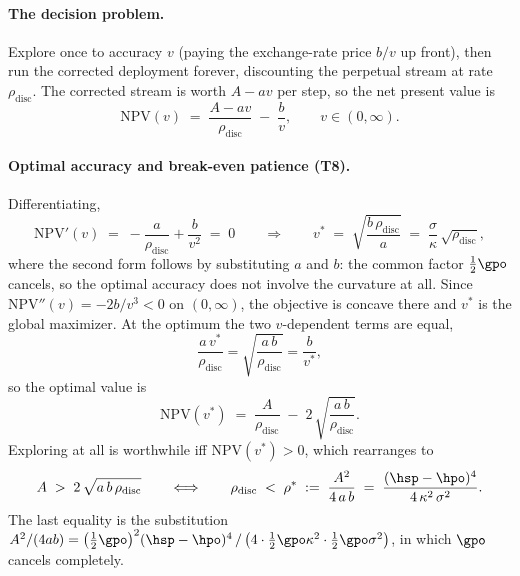 \paragraph{The decision problem.}
Explore once to accuracy $v$ (paying the exchange-rate price $b/v$ up
front), then run the corrected deployment forever, discounting the
perpetual stream at rate $\rho_{\mathrm{disc}}$. The corrected stream is
worth $A - a v$ per step, so the net present value is
\begin{equation*}
\mathrm{NPV}(v) \;=\; \frac{A - a v}{\rho_{\mathrm{disc}}} \;-\;
\frac{b}{v}, \qquad v \in (0,\infty).
\end{equation*}

\paragraph{Optimal accuracy and break-even patience (T8).}
Differentiating,
\begin{equation*}
\mathrm{NPV}'(v) \;=\; -\frac{a}{\rho_{\mathrm{disc}}} + \frac{b}{v^2}
\;=\; 0
\qquad\Longrightarrow\qquad
v^{*} \;=\; \sqrt{\frac{b\,\rho_{\mathrm{disc}}}{a}}
\;=\; \frac{\sigma}{\kappa}\,\sqrt{\rho_{\mathrm{disc}}},
\end{equation*}
where the second form follows by substituting $a$ and $b$: the common
factor $\tfrac{1}{2}\gpo$ cancels, so the optimal accuracy does not
involve the curvature at all. Since $\mathrm{NPV}''(v) = -2b/v^3 < 0$ on
$(0,\infty)$, the objective is concave there and $v^{*}$ is the global
maximizer. At the optimum the two $v$-dependent terms are equal,
\begin{equation*}
\frac{a\,v^{*}}{\rho_{\mathrm{disc}}}
= \sqrt{\frac{a\,b}{\rho_{\mathrm{disc}}}}
= \frac{b}{v^{*}},
\end{equation*}
so the optimal value is
\begin{equation*}
\mathrm{NPV}(v^{*}) \;=\; \frac{A}{\rho_{\mathrm{disc}}}
\;-\; 2\,\sqrt{\frac{a\,b}{\rho_{\mathrm{disc}}}} .
\end{equation*}
Exploring at all is worthwhile iff $\mathrm{NPV}(v^{*}) > 0$, which
rearranges to
\begin{equation*}
A \;>\; 2\,\sqrt{a\,b\,\rho_{\mathrm{disc}}}
\qquad\Longleftrightarrow\qquad
\rho_{\mathrm{disc}} \;<\; \rho^{*} \;:=\; \frac{A^2}{4\,a\,b}
\;=\; \frac{(\hsp - \hpo)^4}{4\,\kappa^2\,\sigma^2}.
\end{equation*}
The last equality is the substitution
$A^2/(4ab) = \big(\tfrac{1}{2}\gpo\big)^2 (\hsp-\hpo)^4 \,/\,
\big(4 \cdot \tfrac{1}{2}\gpo \kappa^2 \cdot \tfrac{1}{2}\gpo
\sigma^2\big)$, in which $\gpo$ cancels completely.

